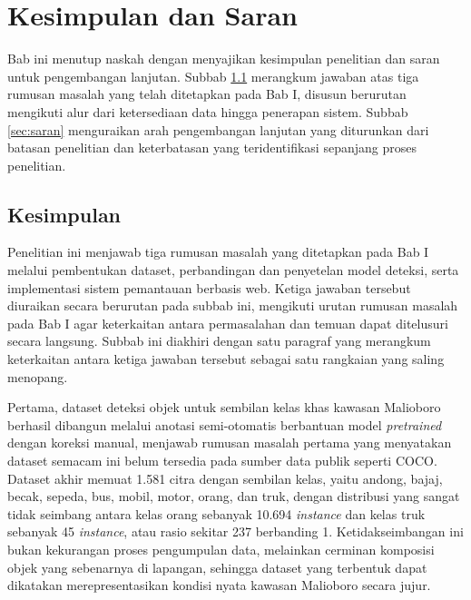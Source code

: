 \chapter{Kesimpulan dan Saran}

Bab ini menutup naskah dengan menyajikan kesimpulan penelitian dan saran untuk 
pengembangan lanjutan. Subbab \ref{sec:kesimpulan} merangkum jawaban atas tiga rumusan 
masalah yang telah ditetapkan pada Bab I, disusun berurutan mengikuti alur dari 
ketersediaan data hingga penerapan sistem. Subbab \ref{sec:saran} menguraikan arah 
pengembangan lanjutan yang diturunkan dari batasan penelitian dan keterbatasan yang 
teridentifikasi sepanjang proses penelitian.

\section{Kesimpulan}
\label{sec:kesimpulan}

Penelitian ini menjawab tiga rumusan masalah yang ditetapkan pada Bab I melalui 
pembentukan dataset, perbandingan dan penyetelan model deteksi, serta implementasi sistem 
pemantauan berbasis web. Ketiga jawaban tersebut diuraikan secara berurutan pada subbab 
ini, mengikuti urutan rumusan masalah pada Bab I agar keterkaitan antara permasalahan dan 
temuan dapat ditelusuri secara langsung. Subbab ini diakhiri dengan satu paragraf yang 
merangkum keterkaitan antara ketiga jawaban tersebut sebagai satu rangkaian yang saling 
menopang.

Pertama, dataset deteksi objek untuk sembilan kelas khas kawasan Malioboro berhasil 
dibangun melalui anotasi semi-otomatis berbantuan model \textit{pretrained} dengan koreksi 
manual, menjawab rumusan masalah pertama yang menyatakan dataset semacam ini belum 
tersedia pada sumber data publik seperti COCO. Dataset akhir memuat 1.581 citra dengan 
sembilan kelas, yaitu andong, bajaj, becak, sepeda, bus, mobil, motor, orang, dan truk, 
dengan distribusi yang sangat tidak seimbang antara kelas orang sebanyak 10.694 
\textit{instance} dan kelas truk sebanyak 45 \textit{instance}, atau rasio sekitar 237 
berbanding 1. Ketidakseimbangan ini bukan kekurangan proses pengumpulan data, melainkan 
cerminan komposisi objek yang sebenarnya di lapangan, sehingga dataset yang terbentuk 
dapat dikatakan merepresentasikan kondisi nyata kawasan Malioboro secara jujur.


